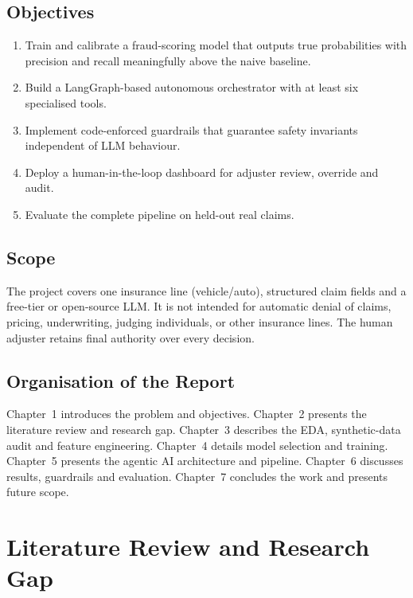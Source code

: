 \documentclass[12pt,a4paper]{article}
\begin{document}
\subsection{Objectives}

\begin{enumerate}
    \item Train and calibrate a fraud-scoring model that outputs true probabilities with precision and recall meaningfully above the naive baseline.
    \item Build a LangGraph-based autonomous orchestrator with at least six specialised tools.
    \item Implement code-enforced guardrails that guarantee safety invariants independent of LLM behaviour.
    \item Deploy a human-in-the-loop dashboard for adjuster review, override and audit.
    \item Evaluate the complete pipeline on held-out real claims.
\end{enumerate}

\subsection{Scope}

The project covers one insurance line (vehicle/auto), structured claim fields and a free-tier or open-source LLM.  It is not intended for automatic denial of claims, pricing, underwriting, judging individuals, or other insurance lines.  The human adjuster retains final authority over every decision.

\subsection{Organisation of the Report}

Chapter~1 introduces the problem and objectives.  Chapter~2 presents the literature review and research gap.  Chapter~3 describes the EDA, synthetic-data audit and feature engineering.  Chapter~4 details model selection and training.  Chapter~5 presents the agentic AI architecture and pipeline.  Chapter~6 discusses results, guardrails and evaluation.  Chapter~7 concludes the work and presents future scope.


\newpage
\section{Literature Review and Research Gap}
\label{ch:litreview}
\end{document}

